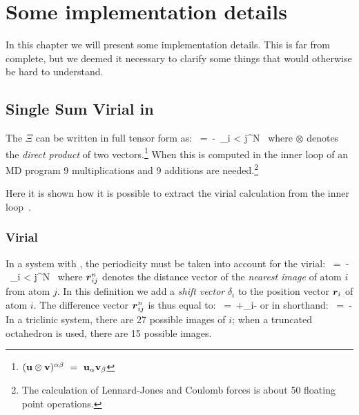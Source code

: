 %
% 
% 
% 
% 
% 
% 
% 
% 
%

\chapter{Some implementation details}
In this chapter we will present some implementation details. This is
far from complete, but we deemed it necessary to clarify some things
that would otherwise be hard to understand.

\section{Single Sum Virial in {\gromacs}}
\label{sec:virial}
The  $\Xi$ can be written in full tensor form as:
\beq
\Xi~=~-\half~\sum_{i < j}^N~\rvij\otimes\Fvij
\eeq
where $\otimes$ denotes the {\em direct product} of two vectors.\footnote
{$({\bf u}\otimes{\bf v})^{\alpha\beta}~=~{\bf u}_{\alpha}{\bf v}_{\beta}$} When this is 
computed in the inner loop of an MD program 9 multiplications and 9
additions are needed.\footnote{The calculation of 
Lennard-Jones and Coulomb forces is about 50 floating point operations.}

Here it is shown how it is possible to extract the virial calculation
from the inner loop~\cite{Bekker93b}.

\subsection{Virial}
In a system with , the
periodicity must be taken into account for the virial:
\beq
\Xi~=~-\half~\sum_{i < j}^{N}~\rnij\otimes\Fvij
\eeq
where $\mbox{\boldmath ${r}$}_{ij}^n$ denotes the distance vector of the
{\em nearest image} of atom $i$ from atom $j$. In this definition we add
a {\em shift vector} $\delta_i$ to the position vector $\mbox{\boldmath ${r}$}_i$ 
of atom $i$. The difference vector $\mbox{\boldmath ${r}$}_{ij}^n$ is thus equal to:
\beq
\rnij~=~\rvi+\delta_i-\rvj
\eeq
or in shorthand:
\beq
\rnij~=~\rni-\rvj
\eeq
In a triclinic system, there are 27 possible images of $i$; when a truncated 
octahedron is used, there are 15 possible images.

